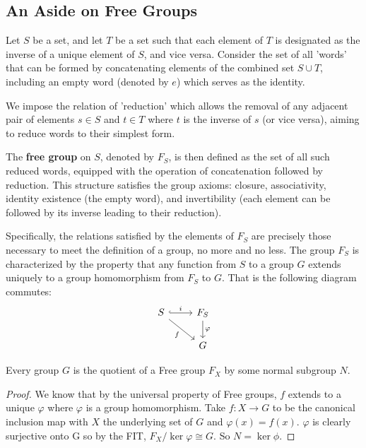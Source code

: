 \subsection{An Aside on Free Groups}

\begin{definition}
Let $S$ be a set, and let $T$ be a set such that each element of $T$ is designated as the inverse of a unique element of $S$, and vice versa. Consider the set of all 'words' that can be formed by concatenating elements of the combined set $S \cup T$, including an empty word (denoted by $e$) which serves as the identity.

We impose the relation of 'reduction' which allows the removal of any adjacent pair of elements $s \in S$ and $t \in T$ where $t$ is the inverse of $s$ (or vice versa), aiming to reduce words to their simplest form. 

The \textbf{free group} on $S$, denoted by $F_S$, is then defined as the set of all such reduced words, equipped with the operation of concatenation followed by reduction. This structure satisfies the group axioms: closure, associativity, identity existence (the empty word), and invertibility (each element can be followed by its inverse leading to their reduction).

Specifically, the relations satisfied by the elements of $F_S$ are precisely those necessary to meet the definition of a group, no more and no less. The group $F_S$ is characterized by the property that any function from $S$ to a group $G$ extends uniquely to a group homomorphism from $F_S$ to $G$. That is the following diagram commutes:
\[
\begin{tikzcd}
S \arrow[r, hook, "i"] \arrow[rd, "f"'] & F_S \arrow[d, "\varphi"] \\
 & G
\end{tikzcd}
\]
\end{definition}

\begin{theorem}
    Every group $G$ is the quotient of a Free group $F_X$ by some normal subgroup $N$.
\end{theorem}

\begin{proof}
    We know that by the universal property of Free groups, $f$ extends to a unique $\varphi$ where $\varphi$ is a group homomorphism. Take $f: X \to G$ to be the canonical inclusion map with $X$ the underlying set of $G$ and $\varphi(x) = f(x).$ $\varphi$ is clearly surjective onto G so by the FIT, $F_X/\ker \varphi \cong G$. So $N = \ker \phi$.
\end{proof}

